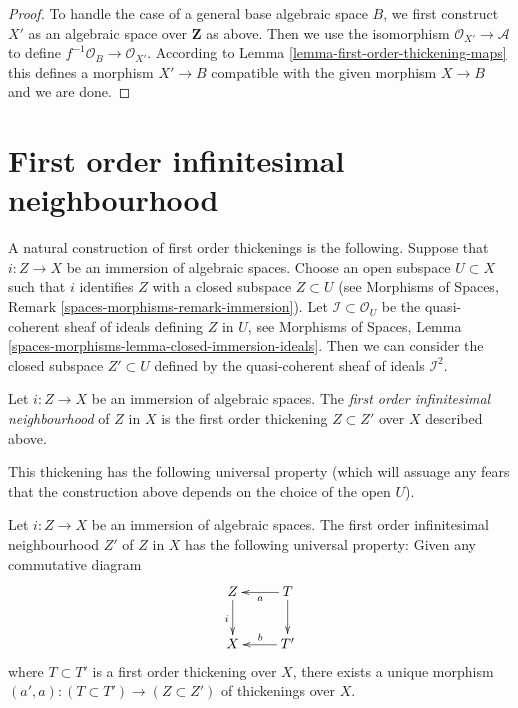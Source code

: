 \begin{proof}
\medskip\noindent
To handle the case of a general base algebraic space $B$, we first
construct $X'$ as an algebraic space over $\mathbf{Z}$ as above.
Then we use the isomorphism $\mathcal{O}_{X'} \to \mathcal{A}$ to
define $f^{-1}\mathcal{O}_B \to \mathcal{O}_{X'}$. According to
Lemma \ref{lemma-first-order-thickening-maps}
this defines a morphism $X' \to B$ compatible with the given morphism
$X \to B$ and we are done.
\end{proof}







\section{First order infinitesimal neighbourhood}
\label{section-first-order-infinitesimal-neighbourhood}

\noindent
A natural construction of first order thickenings is the following.
Suppose that $i : Z \to X$ be an immersion of algebraic spaces. Choose an
open subspace $U \subset X$ such that $i$ identifies $Z$ with a closed
subspace $Z \subset U$ (see
Morphisms of Spaces, Remark \ref{spaces-morphisms-remark-immersion}).
Let $\mathcal{I} \subset \mathcal{O}_U$ be the
quasi-coherent sheaf of ideals defining $Z$ in $U$, see
Morphisms of Spaces,
Lemma \ref{spaces-morphisms-lemma-closed-immersion-ideals}.
Then we can consider
the closed subspace $Z' \subset U$ defined by the quasi-coherent sheaf
of ideals $\mathcal{I}^2$.

\begin{definition}
\label{definition-first-order-infinitesimal-neighbourhood}
Let $i : Z \to X$ be an immersion of algebraic spaces. The
{\it first order infinitesimal neighbourhood} of $Z$ in $X$ is
the first order thickening $Z \subset Z'$ over $X$ described above.
\end{definition}

\noindent
This thickening has the following universal property (which will assuage
any fears that the construction above depends on the choice of the open
$U$).

\begin{lemma}
\label{lemma-first-order-infinitesimal-neighbourhood}
Let $i : Z \to X$ be an immersion of algebraic spaces.
The first order infinitesimal neighbourhood $Z'$ of $Z$ in $X$
has the following universal property:
Given any commutative diagram
$$
\xymatrix{
Z \ar[d]_i & T \ar[l]^a \ar[d] \\
X & T' \ar[l]_b
}
$$
where $T \subset T'$ is a first order thickening over $X$, there exists
a unique morphism $(a', a) : (T \subset T') \to (Z \subset Z')$ of
thickenings over $X$.
\end{lemma}


